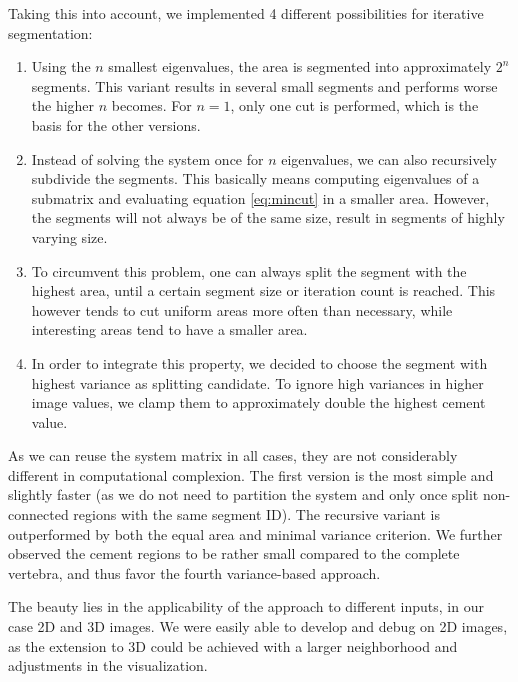 \documentclass{article}
\begin{document}
  Taking this into account, we implemented 4 different possibilities for iterative segmentation:
  \begin{enumerate}
    \item
    Using the $n$ smallest eigenvalues, the area is segmented into approximately $2^n$ segments.
    This variant results in several small segments and performs worse the higher $n$ becomes.
    For $n = 1$, only one cut is performed, which is the basis for the other versions.
    \item
    Instead of solving the system once for $n$ eigenvalues, we can also recursively subdivide the segments.
    This basically means computing eigenvalues of a submatrix and evaluating equation \ref{eq:mincut} in a smaller area.
    However, the segments will not always be of the same size, result in segments of highly varying size.
    \item
    To circumvent this problem, one can always split the segment with the highest area, until a certain segment size or iteration count is reached.
    This however tends to cut uniform areas more often than necessary, while interesting areas tend to have a smaller area.
    \item
    In order to integrate this property, we decided to choose the segment with highest variance as splitting candidate.
    To ignore high variances in higher image values, we clamp them to approximately double the highest cement value.
  \end{enumerate}
  
  As we can reuse the system matrix in all cases, they are not considerably different in computational complexion.
  The first version is the most simple and slightly faster (as we do not need to partition the system and only once split non-connected regions with the same segment ID).
  The recursive variant is outperformed by both the equal area and minimal variance criterion.
  We further observed the cement regions to be rather small compared to the complete vertebra, and thus favor the fourth variance-based approach.
  
  The beauty lies in the applicability of the approach to different inputs, in our case 2D and 3D images.
  We were easily able to develop and debug on 2D images, as the extension to 3D could be achieved with a larger neighborhood and adjustments in the visualization.
  
  
\end{document}
